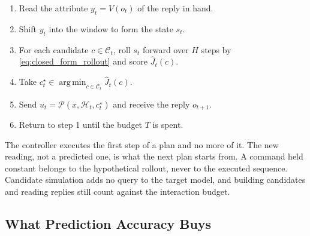 \begin{algorithm}[ht]
\caption{The receding-horizon loop that runs at inference time. Inputs: the frozen
$p_{\theta}$, the fitted $(K,B,b)$, the protocol $\mathcal{P}$, the reference $r$, the horizon
$H$, and an interaction budget $T$.}
\label{alg:loop}
\begin{enumerate}
    \item Read the attribute $y_t=V(o_t)$ of the reply in hand.
    \item Shift $y_t$ into the window to form the state $s_t$.
    \item For each candidate $c\in\mathcal{C}_t$, roll $s_t$ forward over $H$ steps by
          \eqref{eq:closed_form_rollout} and score $\widehat{J}_t(c)$.
    \item Take $c_t^{\star}\in\operatorname*{arg\,min}_{c\in\mathcal{C}_t}\widehat{J}_t(c)$.
    \item Send $u_t=\mathcal{P}(x,\mathcal{H}_t,c_t^{\star})$ and receive the reply $o_{t+1}$.
    \item Return to step 1 until the budget $T$ is spent.
\end{enumerate}
\end{algorithm}

The controller executes the first step of a plan and no more of it. The new
reading, not a predicted one, is what the next plan starts from. A command
held constant belongs to the hypothetical rollout, never to the executed
sequence. Candidate simulation adds no query to the target model, and building
candidates and reading replies still count against the interaction budget.

\subsection{What Prediction Accuracy Buys}
\label{sec:guarantee}

